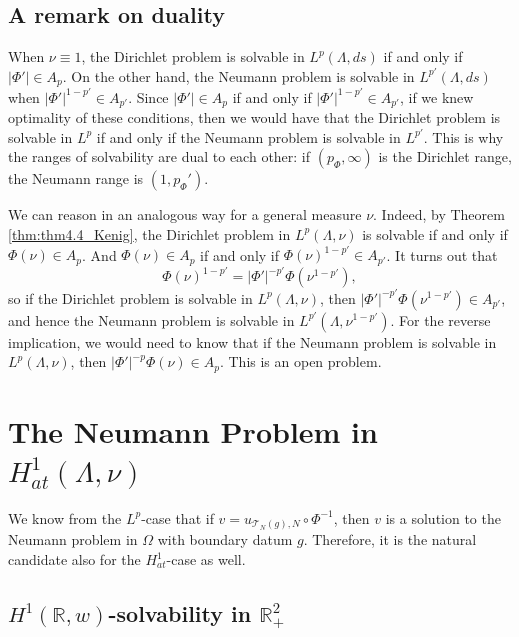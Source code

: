 \documentclass[12pt]{amsart}
\newcommand{\R}{\mathbb{R}}
\theoremstyle{plain}
\theoremstyle{definition}
\numberwithin{equation}{section}
\begin{document}
\subsection{A remark on duality}\label{sec:duality}


When $\nu\equiv 1$, the Dirichlet problem is solvable in $L^p(\Lambda,ds)$ if and only if $|\Phi'|\in A_p$. On the other hand, the Neumann problem is solvable in $L^{p'}(\Lambda,ds)$ when $|\Phi'|^{1-p'}\in A_{p'}$. Since $|\Phi'|\in A_p$ if and only if $|\Phi'|^{1-p'}\in A_{p'}$, if we knew optimality of these conditions, then we would have that the Dirichlet problem is solvable in $L^p$ if and only if the Neumann problem is solvable in $L^{p'}$. This is why the ranges of solvability are dual to each other: if $(p_{\Phi},\infty)$ is the Dirichlet range, the Neumann range is $(1,p_{\Phi}')$.

We can reason in an analogous way for a general measure $\nu$. Indeed, by Theorem \ref{thm:thm4.4_Kenig}, the Dirichlet problem in $L^{p}(\Lambda,\nu)$ is solvable if and only if $\Phi(\nu)\in A_p$. And $\Phi(\nu)\in A_p$ if and only if $\Phi(\nu)^{1-p'}\in A_{p'}$. It turns out that
\[
\Phi(\nu)^{1-p'}
=
|\Phi'|^{-p'}\Phi(\nu^{1-p'}),
\]
so if the Dirichlet problem is solvable in $L^p(\Lambda,\nu)$, then $|\Phi'|^{-p'}\Phi(\nu^{1-p'})\in A_{p'}$, and hence the Neumann problem is solvable in $L^{p'}(\Lambda,\nu^{1-p'})$.   For the reverse implication, we would need to know that if the Neumann problem is solvable in $L^p(\Lambda,\nu)$, then $|\Phi'|^{-p}\Phi(\nu)\in A_p$. {This is an open problem.}






\section{\texorpdfstring{The Neumann Problem in $H_{at}^{1}(\Lambda, \nu)$}{}}\label{sec:H1solvability}


We know from the $L^p$-case that if $v=u_{\mathcal{T}_{N}(g),N}\circ\Phi^{-1}$, then $v$ is a solution to the Neumann problem in $\Omega$ with boundary datum $g$. Therefore, it is the natural candidate also for the $H_{at}^{1}$-case as well. 



\subsection{\texorpdfstring{$H^1(\R,w)$}{}-solvability in \texorpdfstring{$\R_{+}^{2}$}{}}
\end{document}

